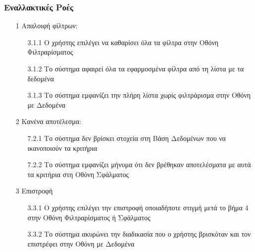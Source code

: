 \documentclass[12pt,a4paper,twoside]{book}
\begin{document}
\subsubsection{Εναλλακτικές Ροές}
\begin{enumerate}
  \item[1 ] Απαλοιφή φίλτρων:
        \begin{enumerate}
          \item[3.1.1 ] Ο χρήστης επιλέγει να καθαρίσει όλα τα φίλτρα στην Οθόνη Φιλτραρίσματος
          \item[3.1.2 ] Το σύστημα αφαιρεί όλα τα εφαρμοσμένα φίλτρα από τη λίστα με τα δεδομένα %
          \item[3.1.3 ] Το σύστημα εμφανίζει την πλήρη λίστα χωρίς φιλτράρισμα στην Οθόνη με Δεδομένα %
        \end{enumerate}
  \item[2 ] Κανένα αποτέλεσμα:
        \begin{enumerate}
          \item[7.2.1 ] Το σύστημα δεν βρίσκει στοχεία στη Βάση Δεδομένων που να ικανοποιούν τα κριτήρια %
          \item[7.2.2 ] Το σύστημα εμφανίζει μήνυμα ότι δεν βρέθηκαν αποτελέσματα με αυτά τα κριτήρια στη Οθόνη Σφάλματος %
        \end{enumerate}
  \item[3 ] Επιστροφή
        \begin{enumerate}
          \item[3.3.1 ] Ο χρήστης επιλέγει την επιστροφή οποιαδήποτε στιγμή μετά το βήμα 4 στην Οθόνη Φιλτραρίσματος ή Σφάλματος %
          \item[3.3.2 ] Το σύστημα ακυρώνει την διαδικασία που ο χρήστης βρισκόταν και τον επιστρέφει στην Οθόνη με Δεδομένα %
        \end{enumerate}
\end{enumerate}
\end{document}

